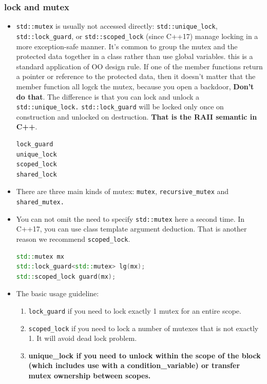 \documentclass[a4paper,11pt,twoside]{book}
\begin{document}
\subsubsection{lock and mutex}

\begin{itemize}
	\item \texttt{std::mutex} is usually not accessed directly: \texttt{std::unique\_lock}, \texttt{std::lock\_guard}, or \texttt{std::scoped\_lock} (since C++17) manage locking in a more exception-safe manner. It's common to group the mutex and the protected data together in a class rather than use global variables. this is a standard application of OO design rule. If one of the member functions return a pointer or reference to the protected data, then it doesn't matter that the member function all logck the mutex, because you open a backdoor, \textbf{Don't do that}.  The difference is that you can lock and unlock a \texttt{std::unique\_lock.} \texttt{std::lock\_guard} will be locked only once on construction and unlocked on destruction. \textbf{That is the RAII semantic in C++}.
\begin{lstlisting}[frame=single, language=c++]	
lock_guard
unique_lock
scoped_lock
shared_lock	
\end{lstlisting}

		\item There are three main kinds of mutex: \texttt{mutex}, \texttt{recursive\_mutex} and \texttt{shared\_mutex.}

	\item You can not omit the need to specify \texttt{std::mutex} here a second time. In C++17, you can use class template argument deduction. That is another reason we recommend \texttt{scoped\_lock}.
	
\begin{lstlisting}[frame=single, language=c++]
std::mutex mx
std::lock_guard<std::mutex> lg(mx);
std::scoped_lock guard(mx);
\end{lstlisting}



	\item The basic usage guideline:
\begin{enumerate}
	\item \texttt{lock\_guard} if you need to lock exactly 1 mutex for an entire scope.
	\item \texttt{scoped\_lock} if you need to lock a number of mutexes that is not exactly 1. It will avoid dead lock problem.
	\item \textbf{unique\_lock if you need to unlock within the scope of the block (which includes use with a condition\_variable) or transfer mutex ownership between scopes.}
\end{enumerate}


\end{itemize}
\end{document}

